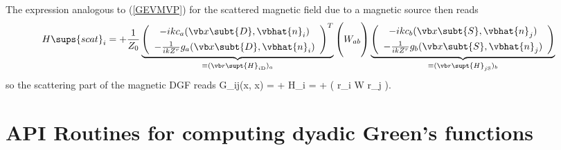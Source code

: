 \documentclass[letterpaper]{article}
\newcommand{\iD}{_{i\text{\tiny D}}}
\newcommand{\jS}{_{j\text{\tiny S}}}
\begin{document}
The expression analogous to (\ref{GEVMVP}) for the scattered
magnetic field due to a magnetic source then reads
\begin{align*}
 H\sups{scat}_i
&=+\frac{1}{Z_0}
  \underbrace{
  \left(\begin{array}{c} 
   -ik c_a(\vb x\subt{D}, \vbhat{n}_i)  \\[4pt]
   -\frac{1}{ik Z^r}  g_a(\vb x\subt{D}, \vbhat{n}_i)
  \end{array}\right)^T
             }_{\equiv (\vb r\supt{H}\iD)_a}
  \left(
 \vphantom{
  \left\{\begin{array}{c} 
     g_a(\vb x\subt{D}, \vbhat{n}_i) \\[4pt]
    -c_a(\vb x\subt{D}, \vbhat{n}_i) 
  \end{array}\right\}^T
          }
         W_{ab}
  \right)
  \underbrace{
  \left(\begin{array}{c} 
   -ik  c_b(\vb x\subt{S}, \vbhat{n}_j)  \\[4pt]
   -\frac{1}{ik Z^r} g_b(\vb x\subt{S}, \vbhat{n}_j)
  \end{array}\right)
             }_{\equiv (\vb r\supt{H}\jS)_b}
\end{align*}
so the scattering part of the magnetic DGF reads
{
 \mc G_{ij}(\vb x, \vb x)
= + H_i
= +
   \Big( \vb r\iD{} \cdot \vb W \cdot \vb r\jS{} \Big).
}

%

\newpage
\section{API Routines for computing dyadic Green's functions}
\end{document}
